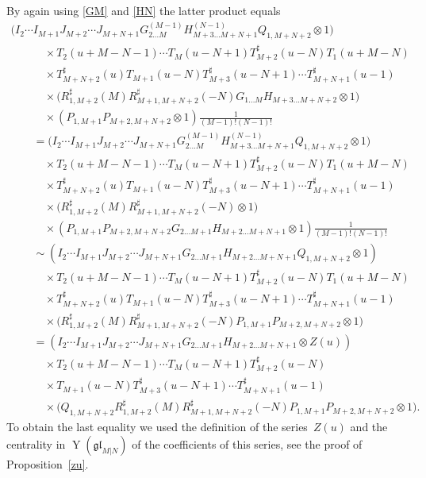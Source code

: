\documentclass[10pt,a4paper]{amsart}
\numberwithin{equation}{section}
\def\glMN{\mathfrak{gl}_{M|N}}
\def\ot{\otimes}
\def\RS{R^{\sharp}}
\def\TS{T^{\sharp}}
\def\YMN{\operatorname{Y}(\glMN)}
\begin{document}
By again using \eqref{GM} and \eqref{HN} the latter product equals
\begin{gather*}
\big( I_{2} \cdots I_{M+1}
J_{M+2} \cdots J_{M+N+1}
G_{2 \dots M}^{(M-1)} H_{M+3 \dots M+N+1}^{(N-1)}
Q_{1,M+N+2}\ot1 \big)\\
\qquad\quad{} \times
T_2 (u+M-N-1) \cdots T_{M} (u-N+1)
\TS_{M+2} (u-N) T_1 (u+M-N)\\
\qquad\quad{} \times
\TS_{M+N+2} (u) T_{M+1} (u-N)
\TS_{M+3} (u-N+1) \cdots \TS_{M+N+1} (u-1)\\
\qquad\quad{} \times
\big( \RS_{1,M+2} (M ) \RS_{M+1,M+N+2} (-N )
G_{1 \dots M} H_{M+3 \dots M+N+2}\ot1 \big)\\
\qquad\quad{} \times
( P_{1,M+1} P_{M+2,M+N+2}\ot1 )
\frac1{(M-1) ! (N-1) !} \\
\qquad{} =
\big( I_{2} \cdots I_{M+1}
J_{M+2} \cdots J_{M+N+1}
G_{2 \dots M}^{(M-1)} H_{M+3 \dots M+N+1}^{(N-1)}
Q_{1,M+N+2}\ot1 \big)\\
\qquad\quad{} \times
T_2 (u+M-N-1) \cdots T_{M} (u-N+1)
\TS_{M+2} (u-N) T_1 (u+M-N)\\
\qquad\quad{} \times
\TS_{M+N+2} (u) T_{M+1} (u-N)
\TS_{M+3} (u-N+1) \cdots \TS_{M+N+1} (u-1)\\
\qquad\quad{} \times
\big( \RS_{1,M+2} (M ) \RS_{M+1,M+N+2} (-N )\ot1 \big)\\
\qquad\quad{} \times
( P_{1,M+1} P_{M+2,M+N+2}
G_{2 \dots M+1} H_{M+2 \dots M+N+1}
\ot1 )
\frac1{(M-1) ! (N-1) !} \\
\qquad{} \sim
( I_{2} \cdots I_{M+1}
J_{M+2} \cdots J_{M+N+1}
G_{2 \dots M+1} H_{M+2 \dots M+N+1} Q_{1,M+N+2}
\ot1 )\\
\qquad\quad{} \times
T_2 (u+M-N-1) \cdots T_{M} (u-N+1)
\TS_{M+2} (u-N) T_1 (u+M-N)\\
\qquad\quad{} \times
\TS_{M+N+2} (u) T_{M+1} (u-N)
\TS_{M+3} (u-N+1) \cdots \TS_{M+N+1} (u-1)\\
\qquad\quad{} \times
\big( \RS_{1,M+2} (M ) \RS_{M+1,M+N+2} (-N )
P_{1,M+1} P_{M+2,M+N+2}\ot1 \big) \\
\qquad{} =
( I_{2} \cdots I_{M+1}
J_{M+2} \cdots J_{M+N+1}
G_{2 \dots M+1} H_{M+2 \dots M+N+1}\ot Z(u) )\\
\qquad\quad{} \times
T_2 (u+M-N-1) \cdots T_{M} (u-N+1)
\TS_{M+2} (u-N)\\
\qquad\quad{} \times
T_{M+1} (u-N)
\TS_{M+3} (u-N+1) \cdots \TS_{M+N+1} (u-1)\\
\qquad\quad{} \times
 \big( Q_{1,M+N+2} \RS_{1,M+2} (M ) \RS_{M+1,M+N+2} (-N )
P_{1,M+1} P_{M+2,M+N+2}\ot1 \big) .
\end{gather*}
To obtain the last equality we used the definition of the series~$Z(u)$
and the centrality in $\YMN$ of the coefficients of this series, see the proof
of Proposition~\ref{zu}.
\end{document}
